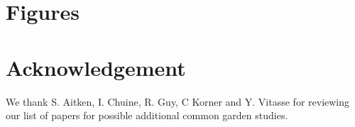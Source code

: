 \documentclass{article}
\begin{document}






\section{Figures}







\section{Acknowledgement}
We thank S. Aitken,  I. Chuine, R. Guy, C Korner and Y. Vitasse for reviewing our list of papers for possible additional common garden studies. 
\end{document}
